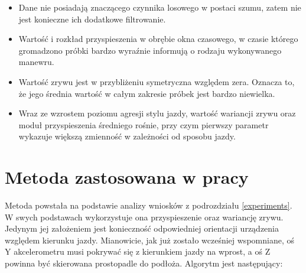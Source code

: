 \begin{itemize}
\item Dane nie posiadają znaczącego czynnika losowego w postaci szumu, zatem nie jest konieczne ich dodatkowe filtrowanie.
\item Wartość i rozkład przyspieszenia w obrębie okna czasowego, w czasie którego gromadzono próbki bardzo wyraźnie informują o rodzaju wykonywanego manewru.
\item Wartość zrywu jest w przybliżeniu symetryczna względem zera. Oznacza to, że jego średnia wartość w całym zakresie próbek jest bardzo niewielka.
\item Wraz ze wzrostem poziomu agresji stylu jazdy, wartość wariancji zrywu oraz moduł przyspieszenia średniego rośnie, przy czym pierwszy parametr wykazuje większą zmienność w zależności od sposobu jazdy. 
\end{itemize}

\section{Metoda zastosowana w pracy}

Metoda powstała na podstawie analizy wniosków z podrozdziału \ref{experiments}. W swych podstawach wykorzystuje ona przyspieszenie oraz wariancję zrywu. Jedynym jej założeniem jest konieczność odpowiedniej orientacji urządzenia względem kierunku jazdy. Mianowicie, jak już zostało wcześniej wspomniane, oś Y akcelerometru musi pokrywać się z kierunkiem jazdy na wprost, a oś Z powinna być skierowana prostopadle do podłoża. Algorytm jest następujący:

